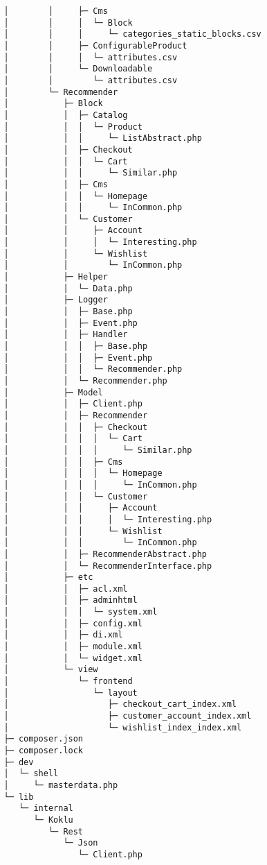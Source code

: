 \begin{codebox}
\begin{verbatim}
   │        │     ├─ Cms
   │        │     │  └─ Block
   │        │     │     └─ categories_static_blocks.csv
   │        │     ├─ ConfigurableProduct
   │        │     │  └─ attributes.csv
   │        │     └─ Downloadable
   │        │        └─ attributes.csv
   │        └─ Recommender
   │           ├─ Block
   │           │  ├─ Catalog
   │           │  │  └─ Product
   │           │  │     └─ ListAbstract.php
   │           │  ├─ Checkout
   │           │  │  └─ Cart
   │           │  │     └─ Similar.php
   │           │  ├─ Cms
   │           │  │  └─ Homepage
   │           │  │     └─ InCommon.php
   │           │  └─ Customer
   │           │     ├─ Account
   │           │     │  └─ Interesting.php
   │           │     └─ Wishlist
   │           │        └─ InCommon.php
   │           ├─ Helper
   │           │  └─ Data.php
   │           ├─ Logger
   │           │  ├─ Base.php
   │           │  ├─ Event.php
   │           │  ├─ Handler
   │           │  │  ├─ Base.php
   │           │  │  ├─ Event.php
   │           │  │  └─ Recommender.php
   │           │  └─ Recommender.php
   │           ├─ Model
   │           │  ├─ Client.php
   │           │  ├─ Recommender
   │           │  │  ├─ Checkout
   │           │  │  │  └─ Cart
   │           │  │  │     └─ Similar.php
   │           │  │  ├─ Cms
   │           │  │  │  └─ Homepage
   │           │  │  │     └─ InCommon.php
   │           │  │  └─ Customer
   │           │  │     ├─ Account
   │           │  │     │  └─ Interesting.php
   │           │  │     └─ Wishlist
   │           │  │        └─ InCommon.php
   │           │  ├─ RecommenderAbstract.php
   │           │  └─ RecommenderInterface.php
   │           ├─ etc
   │           │  ├─ acl.xml
   │           │  ├─ adminhtml
   │           │  │  └─ system.xml
   │           │  ├─ config.xml
   │           │  ├─ di.xml
   │           │  ├─ module.xml
   │           │  └─ widget.xml
   │           └─ view
   │              └─ frontend
   │                 └─ layout
   │                    ├─ checkout_cart_index.xml
   │                    ├─ customer_account_index.xml
   │                    └─ wishlist_index_index.xml
   ├─ composer.json
   ├─ composer.lock
   ├─ dev
   │  └─ shell
   │     └─ masterdata.php
   └─ lib
      └─ internal
         └─ Koklu
            └─ Rest
               └─ Json
                  └─ Client.php

\end{verbatim}
\end{codebox}

